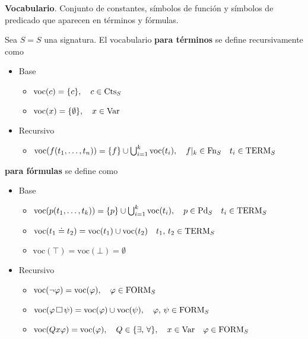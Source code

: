 \begin{definition}\textbf{Vocabulario}.
Conjunto de constantes, símbolos de función y símbolos de predicado que aparecen en términos y fórmulas. 
\end{definition}

\begin{definition}
Sea $S= \si{S}$ una signatura. El vocabulario \textbf{para términos} se define recursivamente como
\begin{itemize}
	\item Base 
	\begin{itemize}
		\item $\mbox{voc}(c)=\{ c \}, \quad c \in \mbox{Cts}_{S}$ 
		\item $\mbox{voc}(x)=\{ \emptyset \}, \quad x \in \mbox{Var}$ 
	\end{itemize}
	\item Recursivo 
	\begin{itemize}
		\item $\mbox{voc}(f(t_1, \ldots, t_n))=\{ f \} \cup \bigcup_{i=1}^k \mbox{voc}(t_i), \quad f\vert_{k} \in \mbox{Fn}_{S} \quad t_i \in \mbox{TERM}_{S}$ 
	\end{itemize}
\end{itemize} 
\textbf{para fórmulas} se define como
\begin{itemize}
	\item Base
	\begin{itemize}
		\item $\mbox{voc}(p(t_1,\ldots, t_k))= \{p\} \cup \bigcup_{i=1}^k \mbox{voc}(t_i), \quad p \in \mbox{Pd}_{S} \quad t_i \in \mbox{TERM}_{S}$
		\item $\mbox{voc}(t_1 \doteq t_2)= \mbox{voc}(t_1) \cup \mbox{voc}(t_2) \quad t_1,\, t_2 \in \mbox{TERM}_{S}$
		\item $\mbox{voc}(\top)=\mbox{voc}(\bot)=\emptyset$
	\end{itemize}
	\item Recursivo
	\begin{itemize}
		\item $\mbox{voc}(\neg \varphi)=\mbox{voc}(\varphi), \quad \varphi \in \mbox{FORM}_{S}$
		\item $\mbox{voc}(\varphi \, \Box \, \psi) = \mbox{voc}(\varphi) \cup \mbox{voc}(\psi), \quad \varphi, \, \psi \in \mbox{FORM}_{S}$
		\item $\mbox{voc}(Qx\varphi)=\mbox{voc}(\varphi), \quad Q \in \{\exists, \, \forall\}, \quad x \in \mbox{Var} \quad \varphi \in \mbox{FORM}_{S}$
	\end{itemize}
\end{itemize}
\end{definition}

